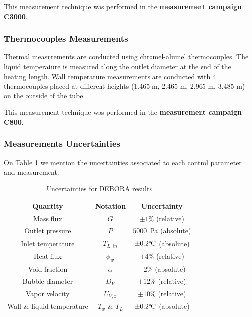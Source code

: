 \begin{note*}{}
This measurement technique was performed in the \textbf{measurement campaign C3000}.
\end{note*}


\subsubsection{Thermocouples Measurements}

Thermal measurements are conducted using chromel-alumel thermocouples. The liquid temperature is measured along the outlet diameter at the end of the heating length. Wall temperature measurements are conducted with 4 thermocouples placed at different heights (1.465 m, 2.465 m, 2.965 m, 3.485 m) on the outside of the tube.

\begin{note*}{}
This measurement technique was performed in the \textbf{measurement campaign C800}.
\end{note*}


\subsubsection{Measurements Uncertainties}

On Table \ref{tab:deb_mes_uncertainty} we mention the uncertainties associated to each control parameter and measurement.

\begin{table}[!h]
\centering
\begin{tabular}{c|c|c} 

Quantity & Notation & Uncertainty \\
\hline \hline
Mass flux & $G$ & $\pm 1\%$ (relative)\\
%
Outlet pressure & $P$ & $5000$\ Pa (absolute)\\
%
Inlet temperature & $T_{L,in}$ & $\pm 0.2\degree\mathrm{C}$ (absolute)\\
%
Heat flux & $\phi_{w}$ & $\pm 4\%$ (relative)\\
%
\hline
\hline
%
Void fraction & $\alpha$ & $\pm 2\%$ (absolute)\\
%
Bubble diameter & $D_{V}$ & $\pm 12\%$ (relative)\\
%
Vapor velocity & $U_{V,z}$ & $\pm 10\%$ (relative)\\
%
Wall \& liquid temperature & $T_{w}$ \& $T_{L}$ & $\pm 0.2\degree\mathrm{C}$ (absolute)\\
\hline
\end{tabular}

\caption{Uncertainties for DEBORA results \cite{gueguen_contribution_2013, cubizolles_etude_1996}}
\label{tab:deb_mes_uncertainty}

\end{table}



